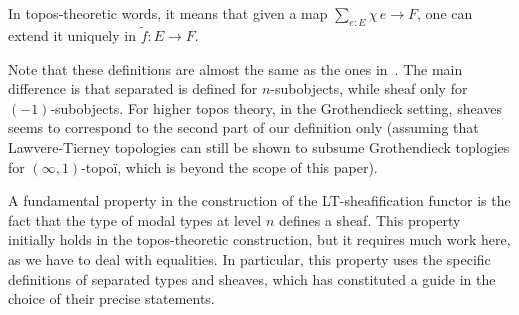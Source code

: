 \documentclass[preprint,9pt,numbers]{sigplanconf}
\begin{document}
In topos-theoretic words, it means that given a map $\sum_{e:E}
\chi\, e\to F$, one can
extend it uniquely in $\tilde f:E \to F$.

Note that these definitions are almost the same as the ones
in~\cite{maclanemoerdijk}. The main difference is that {separated}
is defined for $n$-subobjects, while {sheaf} only for
$(-1)$-subobjects.
%
For higher topos theory, in the Grothendieck setting, sheaves seems
to correspond to the second part of our definition only (assuming that
Lawvere-Tierney topologies can still be shown to subsume Grothendieck
toplogies for $(\infty,1)$-topoï, which is beyond the scope of this paper).
%

A fundamental property in the construction of the LT-sheafification
functor is the fact that the type of modal types at level $n$ defines
a sheaf.
%
This property initially holds in the topos-theoretic construction, but
it requires much work here, as we have to deal with equalities. In
particular, this property uses the specific definitions
of separated types and sheaves, which has constituted a guide in the
choice of their precise statements. 
\end{document}

